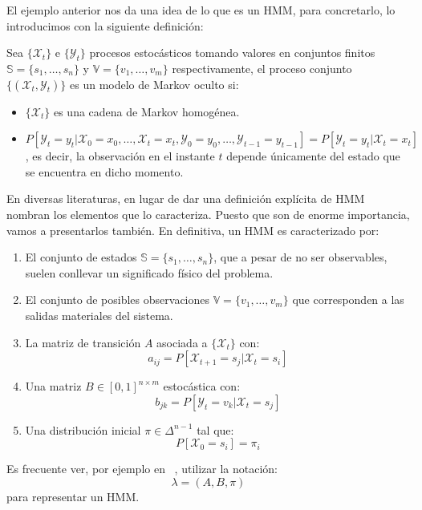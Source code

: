 El ejemplo anterior nos da una idea de lo que es un HMM, para concretarlo, lo introducimos con la siguiente definición:
\begin{definition}
    Sea $\{\mathcal{X}_t\}$ e $\{\mathcal{Y}_t\}$ procesos estocásticos tomando valores en conjuntos finitos $\mathbb{S}=\{s_1,\dots ,s_n\}$ y $\mathbb{V}=\{v_1,\dots ,v_m\}$ respectivamente, el proceso conjunto $\{\left(\mathcal{X}_t,\mathcal{Y}_t\right)\}$ es un modelo de Markov oculto si:
    \begin{itemize}
        \item $\{\mathcal{X}_t\}$ es una cadena de Markov homogénea. 
        \item $P[\mathcal{Y}_t=y_t|\mathcal{X}_0=x_0,\dots,\mathcal{X}_t=x_t,\mathcal{Y}_0=y_0,\dots,\mathcal{Y}_{t-1}=y_{t-1}]=P[\mathcal{Y}_t=y_t|\mathcal{X}_t=x_t]$, es decir, la observación en el instante $t$ depende únicamente del estado que se encuentra en dicho momento.
    \end{itemize}

\end{definition}

En diversas literaturas, en lugar de dar una definición explícita de HMM nombran los elementos que lo caracteriza. Puesto que son de enorme importancia, vamos a presentarlos también. En definitiva, un HMM es caracterizado por:
\begin{enumerate}
    \item El conjunto de estados $\mathbb{S}=\{s_1,\dots ,s_n\}$, que a pesar de no ser observables, suelen conllevar un significado físico del problema.
    \item El conjunto de posibles observaciones $\mathbb{V}=\{v_1,\dots ,v_m\}$ que corresponden a las salidas materiales del sistema.
    \item La matriz de transición $A$ asociada a $\{\mathcal{X}_t\}$ con:
    \[a_{ij} = P[\mathcal{X}_{t+1}=s_j|\mathcal{X}_t=s_i]\]
    \item Una matriz $B\in\left[0,1\right]^{n\times m}$ estocástica con:
    \[b_{jk} = P[\mathcal{Y}_{t}=v_k|\mathcal{X}_t=s_j]\]
    \item Una distribución inicial $\pi\in\Delta^{n-1}$ tal que:
    \[P[\mathcal{X}_{0}=s_i]=\pi_i\]
\end{enumerate}

Es frecuente ver, por ejemplo en ~\cite{Rabiner}, utilizar la notación:
\[\lambda=\left(A,B,\pi\right)\]
para representar un HMM.


